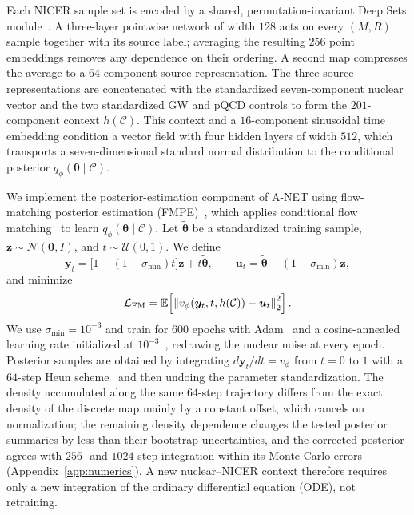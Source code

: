 \documentclass[aps,prd,twocolumn,superscriptaddress,nofootinbib,longbibliography]{revtex4-2}
\begin{document}
Each NICER sample set is encoded by a shared, permutation-invariant Deep Sets
module~\cite{Zaheer:2017wmg}. A three-layer pointwise network of width $128$ acts on every $(M,R)$
sample together with its source label; averaging the resulting $256$ point
embeddings removes any dependence on their ordering. A second map compresses
the average to a $64$-component source representation. The three source
representations are concatenated with the standardized seven-component nuclear
vector and the two standardized GW and pQCD controls
to form the $201$-component context $h(\mathcal C)$. This context and a
$16$-component sinusoidal time embedding condition a vector field with four hidden layers of
width $512$, which transports a seven-dimensional standard normal distribution
to the conditional posterior $q_\phi(\bm\theta\mid\mathcal C)$.

We implement the posterior-estimation component of A-NET using flow-matching
posterior estimation (FMPE)~\cite{Dax:2023ozk}, which applies conditional flow
matching~\cite{Lipman:2023hef} to learn
$q_\phi(\bm\theta\mid\mathcal C)$. Let $\widetilde{\bm\theta}$ be a
standardized training sample,
$\bm z\sim\mathcal N(\bm0,I)$, and $t\sim\mathcal U(0,1)$. We define
\begin{equation}
\bm y_t=\bigl[1-(1-\sigma_{\min})t\bigr]\bm z
       +t\widetilde{\bm\theta},\qquad
\bm u_t=\widetilde{\bm\theta}-(1-\sigma_{\min})\bm z,
\label{eq:anet-flow-path}
\end{equation}
and minimize
\begin{equation}
\mathcal L_{\rm FM}=
\mathbb E\!\left[
\left\|v_\phi(\bm y_t,t,h(\mathcal C))-\bm u_t\right\|_2^2
\right].
\label{eq:anet-flow-loss}
\end{equation}
We use $\sigma_{\min}=10^{-3}$ and train for $600$ epochs with
Adam~\cite{Kingma:2014vow} and a
cosine-annealed learning rate initialized at
$10^{-3}$~\cite{Loshchilov:2016tgk}, redrawing the nuclear noise
at every epoch. Posterior samples are obtained by integrating
$d\bm y_t/dt=v_\phi$ from $t=0$ to $1$ with a $64$-step Heun
scheme~\cite{Hairer:1993ode} and then
undoing the parameter standardization. The density accumulated along the same
$64$-step trajectory differs from the exact density of the discrete map mainly
by a constant offset, which cancels on normalization; the remaining density
dependence changes the tested posterior summaries by less than their bootstrap
uncertainties, and the corrected posterior agrees with $256$- and $1024$-step
integration within its Monte Carlo errors (Appendix~\ref{app:numerics}). A new nuclear--NICER context therefore
requires only a new integration of the ordinary differential equation (ODE),
not retraining.
\end{document}

